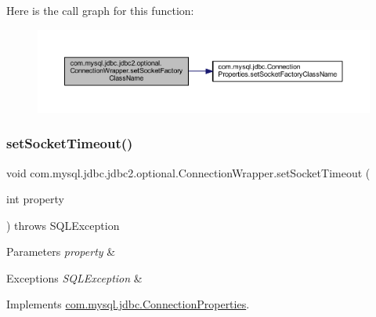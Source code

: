 Here is the call graph for this function\+:
\nopagebreak
\begin{figure}[H]
\begin{center}
\leavevmode
\includegraphics[width=350pt]{classcom_1_1mysql_1_1jdbc_1_1jdbc2_1_1optional_1_1_connection_wrapper_a7a51e27bd16ff0326a017cb9efe65e53_cgraph}
\end{center}
\end{figure}
\mbox{\label{classcom_1_1mysql_1_1jdbc_1_1jdbc2_1_1optional_1_1_connection_wrapper_a9714df2e97bd14e45f7f7a93ba7f4673}} 
\subsubsection{\texorpdfstring{set\+Socket\+Timeout()}{setSocketTimeout()}}
{\footnotesize\ttfamily void com.\+mysql.\+jdbc.\+jdbc2.\+optional.\+Connection\+Wrapper.\+set\+Socket\+Timeout (\begin{DoxyParamCaption}\item[{int}]{property }\end{DoxyParamCaption}) throws S\+Q\+L\+Exception}


\begin{DoxyParams}{Parameters}
{\em property} & \\
\hline
\end{DoxyParams}

\begin{DoxyExceptions}{Exceptions}
{\em S\+Q\+L\+Exception} & \\
\hline
\end{DoxyExceptions}


Implements \mbox{\hyperlink{interfacecom_1_1mysql_1_1jdbc_1_1_connection_properties_a9c60457be4c5136f4c9a46d849b4a5b9}{com.\+mysql.\+jdbc.\+Connection\+Properties}}.

